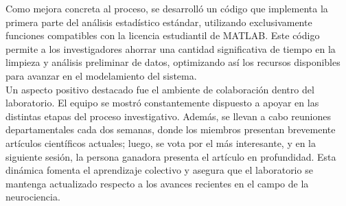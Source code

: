 Como mejora concreta al proceso, se desarrolló un código que implementa la primera parte del análisis estadístico estándar, utilizando exclusivamente funciones compatibles con la licencia estudiantil de MATLAB. Este código permite a los investigadores ahorrar una cantidad significativa de tiempo en la limpieza y análisis preliminar de datos, optimizando así los recursos disponibles para avanzar en el modelamiento del sistema.\\

Un aspecto positivo destacado fue el ambiente de colaboración dentro del laboratorio. El equipo se mostró constantemente dispuesto a apoyar en las distintas etapas del proceso investigativo. Además, se llevan a cabo reuniones departamentales cada dos semanas, donde los miembros presentan brevemente artículos científicos actuales; luego, se vota por el más interesante, y en la siguiente sesión, la persona ganadora presenta el artículo en profundidad. Esta dinámica fomenta el aprendizaje colectivo y asegura que el laboratorio se mantenga actualizado respecto a los avances recientes en el campo de la neurociencia.\\





